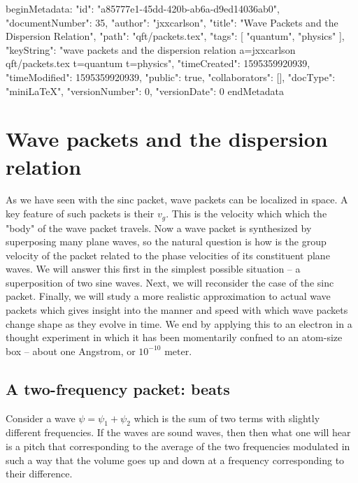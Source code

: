 beginMetadata:
{
    "id": "a85777e1-45dd-420b-ab6a-d9ed14036ab0",
    "documentNumber": 35,
    "author": "jxxcarlson",
    "title": "Wave Packets and the Dispersion Relation",
    "path": "qft/packets.tex",
    "tags": [
        "quantum",
        "physics"
    ],
    "keyString": "wave packets and the dispersion relation a=jxxcarlson qft/packets.tex t=quantum t=physics",
    "timeCreated": 1595359920939,
    "timeModified": 1595359920939,
    "public": true,
    "collaborators": [],
    "docType": "miniLaTeX",
    "versionNumber": 0,
    "versionDate": 0
}
endMetadata

\setcounter{section}{2}

\section{Wave packets and the dispersion relation}




As we have seen with the sinc packet, wave packets can be localized in space.  A key feature of such packets is their  $v_g$.  This is the velocity which which the "body" of the wave packet travels.  Now a wave packet is synthesized by superposing many plane waves, so the natural question is how is the group velocity of the packet related to the phase velocities of its constituent plane waves.  We will answer this first in the simplest possible situation -- a superposition of two sine waves.  Next, we will reconsider the case of the sinc packet.  Finally, we will study a more realistic approximation to actual wave packets which gives insight into the manner and speed with which wave packets change shape as they evolve in time.  We end by applying this to an electron in a thought experiment in which it has been momentarily confned to an atom-size box -- about one Angstrom, or $10^{-10}\text{ meter}$.



\subsection{A two-frequency packet: beats}

Consider a wave 
$\psi = \psi_1 + \psi_2$ which is the sum of two terms with slightly different frequencies.  If the waves are sound waves, then then what one will hear is a pitch that corresponding to the average of the two frequencies modulated in such a way that the volume goes up and down at a frequency corresponding to their difference.

